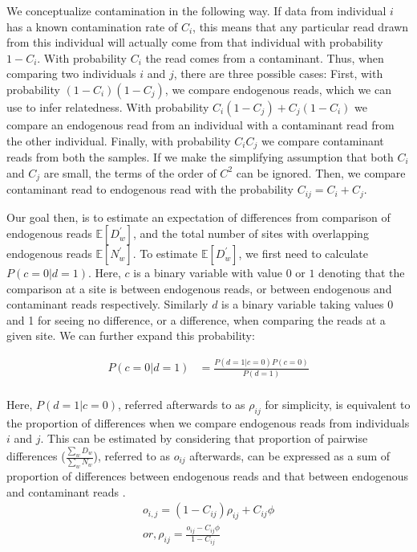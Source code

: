 \documentclass[12pt, letterpaper]{article}
\begin{document}
We conceptualize contamination in the following way. If data from individual $i$ has a known contamination rate of $C_i$, this means that any particular read drawn from this individual will actually come from that individual with probability $1-C_i$. With probability $C_i$ the read comes from a contaminant. Thus, when comparing two individuals $i$ and $j$, there are three possible cases: First, with probability $(1-C_i)(1-C_j)$, we compare endogenous reads, which we can use to infer relatedness. With probability $C_i(1-C_j) + C_j(1-C_i)$ we compare an endogenous read from an individual with a contaminant read from the other individual. Finally, with probability $C_iC_j$ we compare contaminant reads from both the samples. If we make the simplifying assumption that both $C_i$ and $C_j$ are small, the terms of the order of $C^2$ can be ignored. Then, we compare contaminant read to endogenous read with the probability $C_{ij} = C_i + C_j$.

Our goal then, is to estimate an expectation of differences from comparison of endogenous reads $\mathbb{E}[D_w^{'}]$, and the total number of sites with overlapping endogenous reads $\mathbb{E}[N_w^{'}]$. To estimate $\mathbb{E}[D_w^{'}]$, we first need to calculate $P(c=0|d=1)$. Here, $c$ is a binary variable with value $0$ or $1$ denoting that the comparison at a site is between endogenous reads, or between endogenous and contaminant reads respectively. Similarly $d$ is a binary variable taking values 0 and 1 for seeing no difference, or a difference, when comparing the reads at a given site. We can further expand this probability:

\begin{align}\label{eq:12a}
    P(c=0|d=1) &= \frac{P(d=1|c=0)P(c=0)}{P(d=1)} \nonumber\\
\end{align}

Here, $P(d=1|c=0)$, referred afterwards to as $\rho_{ij}$ for simplicity, is equivalent to the proportion of differences when we compare endogenous reads from individuals $i$ and $j$. This can be estimated by considering that proportion of pairwise differences ($\frac{\sum_w D_w}{\sum_w N_w}$), referred to as $o_{ij}$ afterwards, can be expressed as a sum of proportion of differences between endogenous reads and that between endogenous and contaminant reads \cite{peyregne_present-day_2020}. 
\begin{align}\label{eq:13}
    o_{i,j} = (1-C_{ij}) \rho_{ij} + C_{ij} \phi \nonumber\\
    or, \rho_{ij} = \frac{o_{ij} - C_{ij} \phi} {1 - C_{ij}}
\end{align}
\end{document}
